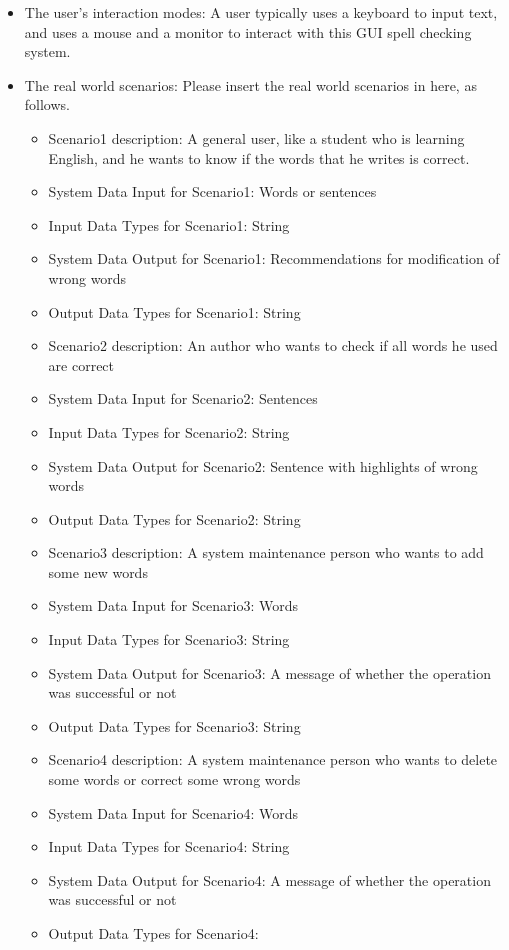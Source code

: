 \begin{itemize}
\item{The user's interaction modes: }
A user typically uses a keyboard to input text, and uses a mouse and a monitor to interact with this GUI spell checking system. 
\item{The real world scenarios: }
Please insert the real world scenarios in here, as follows. 
	\begin{itemize} 
	\item{Scenario1 description: }
	A general user, like a student who is learning English, and he wants to know if the words that he writes is correct.
	\item{System Data Input for Scenario1: }
	Words or sentences
	\item{Input Data Types for Scenario1: }
	String
	\item{System Data Output for Scenario1: }
	Recommendations for modification of wrong words
	\item{Output Data Types for Scenario1: }
	String
	\item{Scenario2 description: }
	An author who wants to check if all words he used are correct 
	\item{System Data Input for Scenario2: }
	Sentences 
	\item{Input Data Types for Scenario2: }
	String
	\item{System Data Output for Scenario2: }
	Sentence with highlights of wrong words
	\item{Output Data Types for Scenario2: }
	String
	\item{Scenario3 description: }
	A system maintenance person who wants to add some new words
	\item{System Data Input for Scenario3: }
	Words  
	\item{Input Data Types for Scenario3: }
	String
	\item{System Data Output for Scenario3: }
	A message of whether the operation was successful or not
	\item{Output Data Types for Scenario3: }
	String
	\item{Scenario4 description: }
	A system maintenance person who wants to delete some words or correct some wrong words
	\item{System Data Input for Scenario4: }
	Words  
	\item{Input Data Types for Scenario4: }
	String
	\item{System Data Output for Scenario4: }
	A message of whether the operation was successful or not
	\item{Output Data Types for Scenario4: }

\end{itemize}
\end{itemize}
